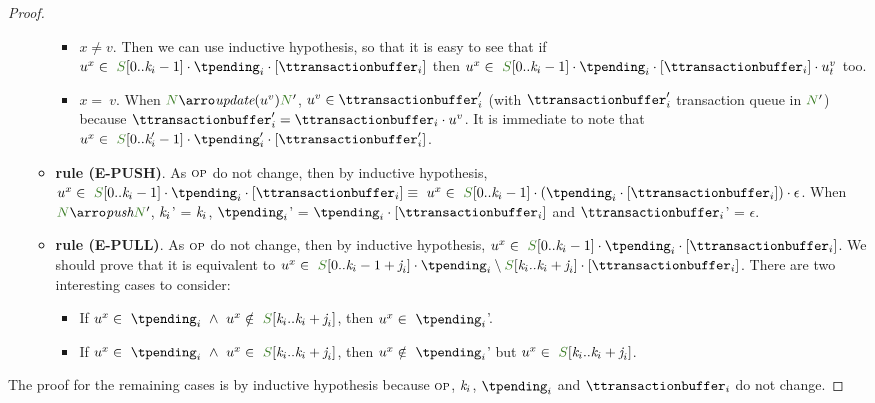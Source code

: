\documentclass[envcountsect,runningheads,orivec]{llncs}
\begin{document}
\begin{proof}
\begin{itemize}
\begin{itemize}
				
					\begin{itemize}
						\item {\bf $x \neq v$}. Then we can use inductive hypothesis, so that it is easy to see that if $u^x \in\  \queuemessage[0..\tknown_i-1] \cdot \tpending_i \cdot [\ttransactionbuffer_i]$ then $u^x \in\  \queuemessage[0..\tknown_i-1] \cdot \tpending_i \cdot [\ttransactionbuffer_i] \cdot u_{t}^v$ too.
						\item {\bf $x =\ v$}. When $\systemterm \arroi{\updatevtran{u}{v}} \systemterm'$, $u^v \in \ttransactionbuffer'_i$ (with $\ttransactionbuffer'_i$ transaction queue in $\systemterm'$) because $\ttransactionbuffer'_i = \ttransactionbuffer_i \cdot u^v$. It is immediate to note that $u^x \in\  \queuemessage[0..\tknown'_i-1] \cdot \tpending'_i \cdot [\ttransactionbuffer'_i]$.
					\end{itemize}
				\item {\bf rule (\textsc{E-PUSH})}. As $\textsc{\scriptsize{OP}}$ do not change, then by inductive hypothesis, $u^x \in\  \queuemessage[0..\tknown_i-1] \cdot \tpending_i \cdot [\ttransactionbuffer_i] \equiv\ u^x \in\  \queuemessage[0..\tknown_i-1] \cdot (\tpending_i \cdot [\ttransactionbuffer_i]) \cdot \epsilon$. When $\systemterm \arroi{\pushtran} \systemterm'$, $\textit{k}_i$' = $\textit{k}_i$, $\tpending_i$' = $\tpending_i \cdot [\ttransactionbuffer_i]$ and $\ttransactionbuffer_i$' = $\epsilon$.
\item {\bf rule (\textsc{E-PULL})}. As $\textsc{\scriptsize{OP}}$ do not change, then by inductive hypothesis, $u^x \in\  \queuemessage[0..\tknown_i-1] \cdot \tpending_i \cdot [\ttransactionbuffer_i]$. We should prove that it is equivalent to $u^x \in\  \queuemessage[0..\tknown_i - 1 + \treceivebuffer_i] \cdot \tpending_i \setminus \queuemessage[\tknown_i .. \tknown_i + \treceivebuffer_i] \cdot [\ttransactionbuffer_i]$. There are two interesting cases to consider:
		\begin{itemize}
			\item If $u^x \in\ \tpending_i\  \land\ u^x \notin\ \queuemessage[\tknown_i .. \tknown_i + \treceivebuffer_i]$, then $u^x \in \ \tpending_i$'.
			\item If $u^x \in\ \tpending_i\  \land\ u^x \in\ \queuemessage[\tknown_i .. \tknown_i + \treceivebuffer_i]$, then $u^x \notin \ \tpending_i$' but $u^x \in\ \queuemessage[\tknown_i .. \tknown_i + \treceivebuffer_i]$. 
		\end{itemize}
\end{itemize}
\end{itemize}

The proof for the remaining cases is by inductive hypothesis because $\textsc{\scriptsize{OP}}$, $\textit{k}_i$, $\tpending_i$ and $\ttransactionbuffer_i$ do not change.

\end{proof}
\end{document}
